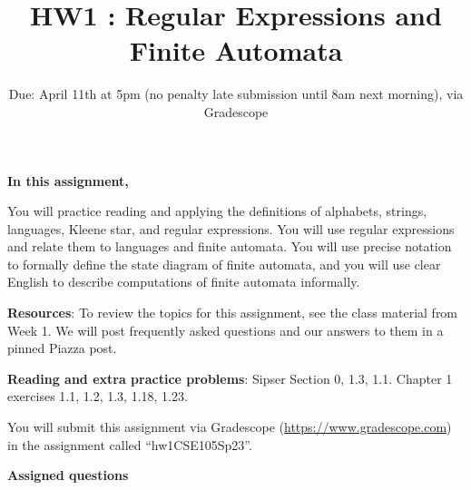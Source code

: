 

\title{HW1 : Regular Expressions and Finite Automata}
\date{Due: April 11th at 5pm (no penalty late submission until 8am next morning), via Gradescope}



\maketitle
\thispagestyle{fancy}


{\bf In this assignment,}

You will practice reading and
applying the definitions of alphabets, strings, languages, Kleene star, and regular expressions.
You will use regular expressions and relate them to languages and finite automata.
You will use precise notation to formally define the state diagram of finite automata,
and you will use clear English to describe computations of finite automata informally.


{\bf Resources}: To review the topics 
for this assignment, see the class material from Week 1.
We will post frequently asked questions and our answers to them in a 
pinned Piazza post.

{\bf Reading and extra practice problems}: Sipser Section 0, 1.3, 1.1.
Chapter 1 exercises 1.1, 1.2, 1.3, 1.18, 1.23.

\instructions

You will submit this assignment via Gradescope
(\href{https://www.gradescope.com}{https://www.gradescope.com}) 
in the assignment called ``hw1CSE105Sp23''.

{\bf Assigned questions}

